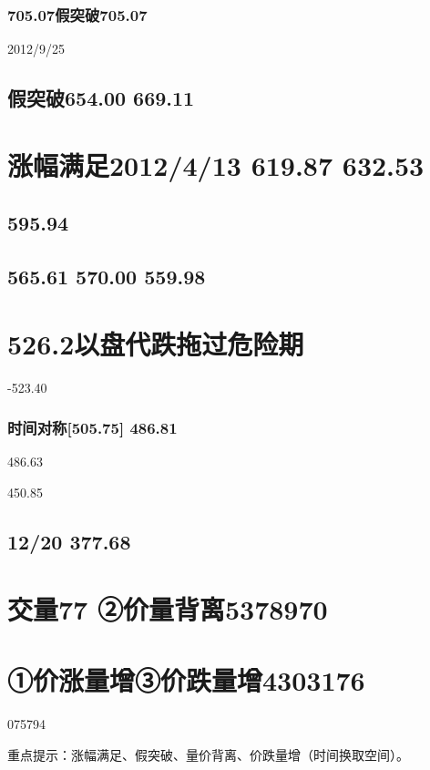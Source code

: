 \documentclass{article}
\begin{document}
\subsubsection{705.07假突破705.07}

2012/9/25

\subsection{假突破654.00 669.11}

\section{涨幅满足2012/4/13 619.87 632.53}

\subsection{595.94}

\subsection{565.61 570.00 559.98}

\section{526.2以盘代跌拖过危险期}

-523.40

\subsubsection{时间对称[505.75] 486.81}

486.63

450.85

\subsection{12/20 377.68}

\section{交量77 ②价量背离5378970}

\section{①价涨量增③价跌量增4303176}

075794

重点提示：涨幅满足、假突破、量价背离、价跌量增（时间换取空间）。
\end{document}
